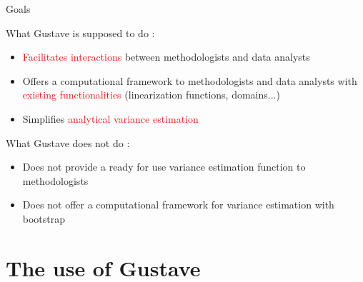 \documentclass[xcolor=dvipsnames]{beamer}
\begin{document}
\begin{frame}{Goals}
   
What Gustave is supposed to do : 

    \vspace{0.1 cm}
    
    \begin{itemize}
        \item \textcolor{red}{Facilitates interactions} between methodologists and data analysts
       
        \vspace{0.1 cm}
        
        \item Offers a computational framework to methodologists and data analysts with \textcolor{red}{existing functionalities} (linearization functions, domains...)
         
        \vspace{0.1 cm}
        
        \item Simplifies \textcolor{red}{analytical variance estimation}
      
    \end{itemize}

    \vspace{0.5 cm}

What Gustave does not do : 
    
    \vspace{0.1 cm}

    \begin{itemize}
        \item Does not provide a ready for use variance estimation function to methodologists
       
        \vspace{0.1 cm}
        
        \item Does not offer a computational framework for variance estimation with bootstrap
    
    \end{itemize}

\end{frame}




\section{The use of Gustave}
\end{document}
